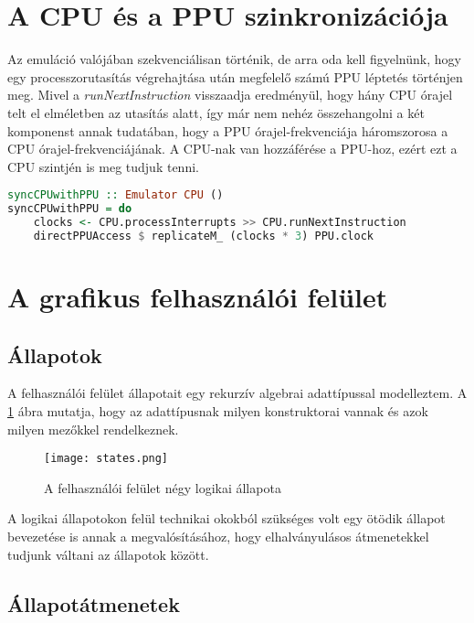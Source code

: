 \section{A CPU és a PPU szinkronizációja}
Az emuláció valójában szekvenciálisan történik, de arra oda kell figyelnünk, hogy egy processzorutasítás végrehajtása után megfelelő számú PPU léptetés történjen meg. Mivel a \emph{runNextInstruction} visszaadja eredményül, hogy hány CPU órajel telt el elméletben az utasítás alatt, így már nem nehéz összehangolni a két komponenst annak tudatában, hogy a PPU órajel-frekvenciája háromszorosa a CPU órajel-frekvenciájának.
A CPU-nak van hozzáférése a PPU-hoz, ezért ezt a CPU szintjén is meg tudjuk tenni.
\begin{lstlisting}[language=Haskell, basicstyle=\scriptsize]
syncCPUwithPPU :: Emulator CPU ()
syncCPUwithPPU = do
	clocks <- CPU.processInterrupts >> CPU.runNextInstruction
	directPPUAccess $ replicateM_ (clocks * 3) PPU.clock
\end{lstlisting}

\section{A grafikus felhasználói felület}
\label{lab:gui}

\subsection{Állapotok}

A felhasználói felület állapotait egy rekurzív algebrai adattípussal modelleztem. A \ref{fig:guistate} ábra mutatja, hogy az adattípusnak milyen konstruktorai vannak és azok milyen mezőkkel rendelkeznek.

\begin{figure}[H]
	\centering
	\texttt{[image: states.png]}
	\caption{A felhasználói felület négy logikai állapota}
	\label{fig:guistate}
\end{figure}

A logikai állapotokon felül technikai okokból szükséges volt egy ötödik állapot bevezetése is annak a megvalósításához, hogy elhalványulásos átmenetekkel tudjunk váltani az állapotok között.

\subsection{Állapotátmenetek}

